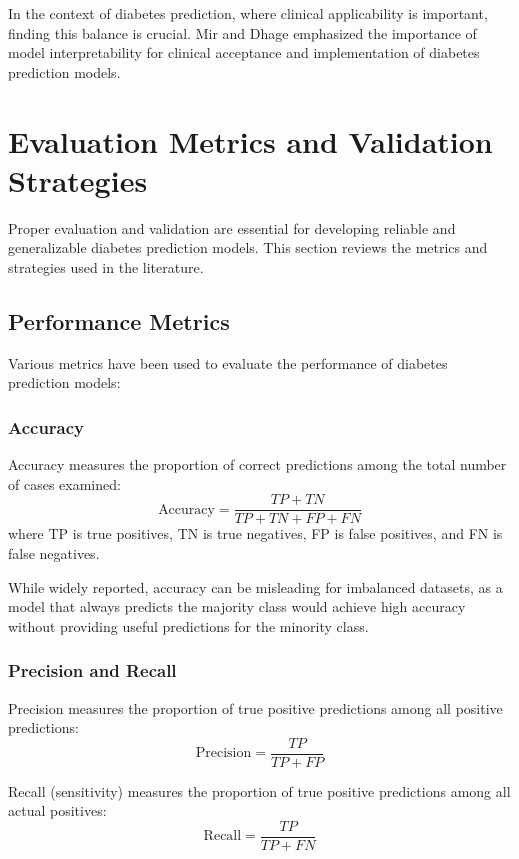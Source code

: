 \documentclass[journal]{IEEEtran}
\begin{document}
In the context of diabetes prediction, where clinical applicability is important, finding this balance is crucial. Mir and Dhage \cite{mir2018} emphasized the importance of model interpretability for clinical acceptance and implementation of diabetes prediction models.

\section{Evaluation Metrics and Validation Strategies}
Proper evaluation and validation are essential for developing reliable and generalizable diabetes prediction models. This section reviews the metrics and strategies used in the literature.

\subsection{Performance Metrics}
Various metrics have been used to evaluate the performance of diabetes prediction models:

\subsubsection{Accuracy}
Accuracy measures the proportion of correct predictions among the total number of cases examined:
\begin{equation}
\text{Accuracy} = \frac{TP + TN}{TP + TN + FP + FN}
\end{equation}
where TP is true positives, TN is true negatives, FP is false positives, and FN is false negatives.

While widely reported, accuracy can be misleading for imbalanced datasets, as a model that always predicts the majority class would achieve high accuracy without providing useful predictions for the minority class.

\subsubsection{Precision and Recall}
Precision measures the proportion of true positive predictions among all positive predictions:
\begin{equation}
\text{Precision} = \frac{TP}{TP + FP}
\end{equation}

Recall (sensitivity) measures the proportion of true positive predictions among all actual positives:
\begin{equation}
\text{Recall} = \frac{TP}{TP + FN}
\end{equation}
\end{document}
